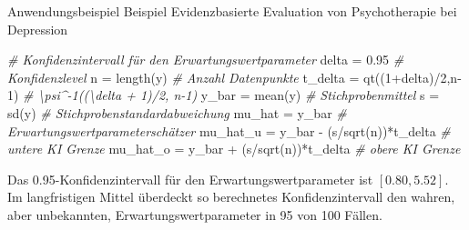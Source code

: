 \documentclass[
  8pt,
  ignorenonframetext,
]{beamer}
\newenvironment{Shaded}{\begin{snugshade}}{\end{snugshade}}
\newcommand{\CommentTok}[1]{\textcolor[rgb]{0.56,0.35,0.01}{\textit{#1}}}
\newcommand{\DecValTok}[1]{\textcolor[rgb]{0.00,0.00,0.81}{#1}}
\newcommand{\FloatTok}[1]{\textcolor[rgb]{0.00,0.00,0.81}{#1}}
\newcommand{\FunctionTok}[1]{\textcolor[rgb]{0.00,0.00,0.00}{#1}}
\newcommand{\NormalTok}[1]{#1}
\newcommand{\OtherTok}[1]{\textcolor[rgb]{0.56,0.35,0.01}{#1}}
\newcommand{\SpecialCharTok}[1]{\textcolor[rgb]{0.00,0.00,0.00}{#1}}
\begin{document}
\begin{frame}[fragile,t]{Anwendungsbeispiel}
\protect\hypertarget{anwendungsbeispiel-4}{}
Beispiel \textbar{} Evidenzbasierte Evaluation von Psychotherapie bei
Depression \vspace{2mm}

\tiny
{}

\begin{Shaded}
\begin{Highlighting}[]
\CommentTok{\# Konfidenzintervall für den Erwartungswertparameter}
\NormalTok{delta    }\OtherTok{=} \FloatTok{0.95}                                 \CommentTok{\# Konfidenzlevel}
\NormalTok{n        }\OtherTok{=} \FunctionTok{length}\NormalTok{(y)                            }\CommentTok{\# Anzahl Datenpunkte}
\NormalTok{t\_delta  }\OtherTok{=} \FunctionTok{qt}\NormalTok{((}\DecValTok{1}\SpecialCharTok{+}\NormalTok{delta)}\SpecialCharTok{/}\DecValTok{2}\NormalTok{,n}\DecValTok{{-}1}\NormalTok{)                  }\CommentTok{\# \textbackslash{}psi\^{}{-}1((\textbackslash{}delta + 1)/2, n{-}1)}
\NormalTok{y\_bar    }\OtherTok{=} \FunctionTok{mean}\NormalTok{(y)                              }\CommentTok{\# Stichprobenmittel}
\NormalTok{s        }\OtherTok{=} \FunctionTok{sd}\NormalTok{(y)                                }\CommentTok{\# Stichprobenstandardabweichung}
\NormalTok{mu\_hat   }\OtherTok{=}\NormalTok{ y\_bar                                }\CommentTok{\# Erwartungswertparameterschätzer}
\NormalTok{mu\_hat\_u }\OtherTok{=}\NormalTok{ y\_bar }\SpecialCharTok{{-}}\NormalTok{ (s}\SpecialCharTok{/}\FunctionTok{sqrt}\NormalTok{(n))}\SpecialCharTok{*}\NormalTok{t\_delta          }\CommentTok{\# untere KI Grenze}
\NormalTok{mu\_hat\_o }\OtherTok{=}\NormalTok{ y\_bar }\SpecialCharTok{+}\NormalTok{ (s}\SpecialCharTok{/}\FunctionTok{sqrt}\NormalTok{(n))}\SpecialCharTok{*}\NormalTok{t\_delta          }\CommentTok{\# obere  KI Grenze}
\end{Highlighting}
\end{Shaded}

\footnotesize
{}

Das 0.95-Konfidenzintervall für den Erwartungswertparameter ist
\([0.80,5.52]\). Im langfristigen Mittel überdeckt so berechnetes
Konfidenzintervall den wahren, aber unbekannten, Erwartungswertparameter
in 95 von 100 Fällen.

\vspace{2mm}

\tiny
{}


\end{frame}
\end{document}
